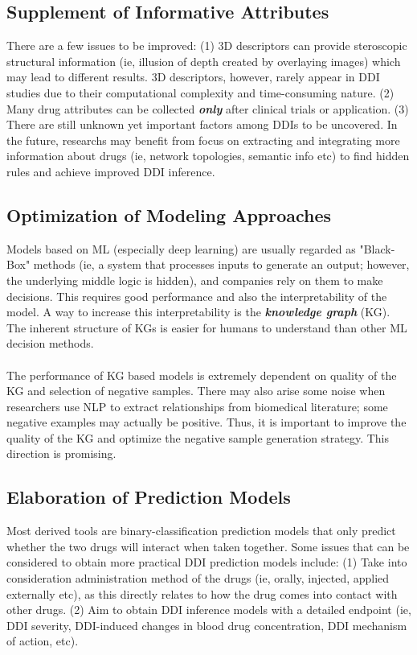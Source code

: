 \documentclass[11pt,a4paper]{article}
\begin{document}
\subsection{Supplement of Informative Attributes}
There are a few issues to be improved: (1) 3D descriptors can provide steroscopic structural information (ie, illusion of depth created by overlaying images) which may lead to different results. 3D descriptors, however, rarely appear in DDI studies due to their computational complexity and time-consuming nature. (2) Many drug attributes can be collected \textbf{\textit{only}} after clinical trials or application. (3) There are still unknown yet important factors among DDIs to be uncovered. In the future, researchs may benefit from focus on extracting and integrating more information about drugs (ie, network topologies, semantic info etc) to find hidden rules and achieve improved DDI inference.

\subsection{Optimization of Modeling Approaches}
Models based on ML (especially deep learning) are usually regarded as "Black-Box" methods (ie, a system that processes inputs to generate an output; however, the underlying middle logic is hidden), and companies rely on them to make decisions. This requires good performance and also the interpretability of the model. A way to increase this interpretability is the \textbf{\textit{knowledge graph}} (KG). The inherent structure of KGs is easier for humans to understand than other ML decision methods. \\ 
\\
The performance of KG based models is extremely dependent on quality of the KG and selection of negative samples. There may also arise some noise when researchers use NLP to extract relationships from biomedical literature; some negative examples may actually be positive. Thus, it is important to improve the quality of the KG and optimize the negative sample generation strategy. This direction is promising.

\subsection{Elaboration of Prediction Models}
Most derived tools are binary-classification prediction models that only predict whether the two drugs will interact when taken together. Some issues that can be considered to obtain more practical DDI prediction models include: (1) Take into consideration administration method of the drugs (ie, orally, injected, applied externally etc), as this directly relates to how the drug comes into contact with other drugs. (2) Aim to obtain DDI inference models with a detailed endpoint (ie, DDI severity, DDI-induced changes in blood drug concentration, DDI mechanism of action, etc).
\end{document}
